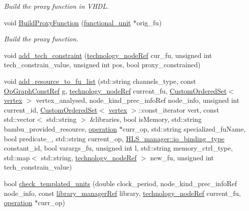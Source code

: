 \begin{DoxyCompactItemize}
\begin{DoxyCompactList}\small\item\em Build the proxy function in V\+H\+DL. \end{DoxyCompactList}\item 
void \hyperlink{classallocation_a7e6e103d4874dd3126414e0f4d8bdd24}{Build\+Proxy\+Function} (\hyperlink{structfunctional__unit}{functional\+\_\+unit} $\ast$orig\+\_\+fu)
\begin{DoxyCompactList}\small\item\em Build the proxy function. \end{DoxyCompactList}\item 
void \hyperlink{classallocation_a8896615bea432f94fc39ba9eb56f410c}{add\+\_\+tech\+\_\+constraint} (\hyperlink{technology__node_8hpp_a33dd193b7bd6b987bf0d8a770a819fa7}{technology\+\_\+node\+Ref} cur\+\_\+fu, unsigned int tech\+\_\+constrain\+\_\+value, unsigned int pos, bool proxy\+\_\+constrained)
\item 
void \hyperlink{classallocation_a88280c4c0b8d9bd5cf61934cf43a0f7b}{add\+\_\+resource\+\_\+to\+\_\+fu\+\_\+list} (std\+::string channels\+\_\+type, const \hyperlink{op__graph_8hpp_a9a0b240622c47584bee6951a6f5de746}{Op\+Graph\+Const\+Ref} g, \hyperlink{technology__node_8hpp_a33dd193b7bd6b987bf0d8a770a819fa7}{technology\+\_\+node\+Ref} current\+\_\+fu, \hyperlink{classCustomOrderedSet}{Custom\+Ordered\+Set}$<$ \hyperlink{graph_8hpp_abefdcf0544e601805af44eca032cca14}{vertex} $>$ vertex\+\_\+analysed, node\+\_\+kind\+\_\+prec\+\_\+info\+Ref node\+\_\+info, unsigned int current\+\_\+id, \hyperlink{classCustomOrderedSet}{Custom\+Ordered\+Set}$<$ \hyperlink{graph_8hpp_abefdcf0544e601805af44eca032cca14}{vertex} $>$\+::const\+\_\+iterator vert, const std\+::vector$<$ std\+::string $>$ \&libraries, bool is\+Memory, std\+::string bambu\+\_\+provided\+\_\+resource, \hyperlink{structoperation}{operation} $\ast$curr\+\_\+op, std\+::string specialized\+\_\+fu\+Name, bool predicate\+\_, std\+::string current\+\_\+op, \hyperlink{classHLS__manager_a972627cc658afa992590b9d2bf1a1e87}{H\+L\+S\+\_\+manager\+::io\+\_\+binding\+\_\+type} constant\+\_\+id, bool varargs\+\_\+fu, unsigned int l, std\+::string memory\+\_\+ctrl\+\_\+type, std\+::map$<$ std\+::string, \hyperlink{technology__node_8hpp_a33dd193b7bd6b987bf0d8a770a819fa7}{technology\+\_\+node\+Ref} $>$ new\+\_\+fu, unsigned int tech\+\_\+constrain\+\_\+value)
\item 
bool \hyperlink{classallocation_a5aa6886382ebdc049a6bc4ef82225973}{check\+\_\+templated\+\_\+units} (double clock\+\_\+period, node\+\_\+kind\+\_\+prec\+\_\+info\+Ref node\+\_\+info, const \hyperlink{library__manager_8hpp_aacc6d633b0aa80ecfeb1180fd480ae68}{library\+\_\+manager\+Ref} library, \hyperlink{technology__node_8hpp_a33dd193b7bd6b987bf0d8a770a819fa7}{technology\+\_\+node\+Ref} current\+\_\+fu, \hyperlink{structoperation}{operation} $\ast$curr\+\_\+op)

\end{DoxyCompactItemize}
